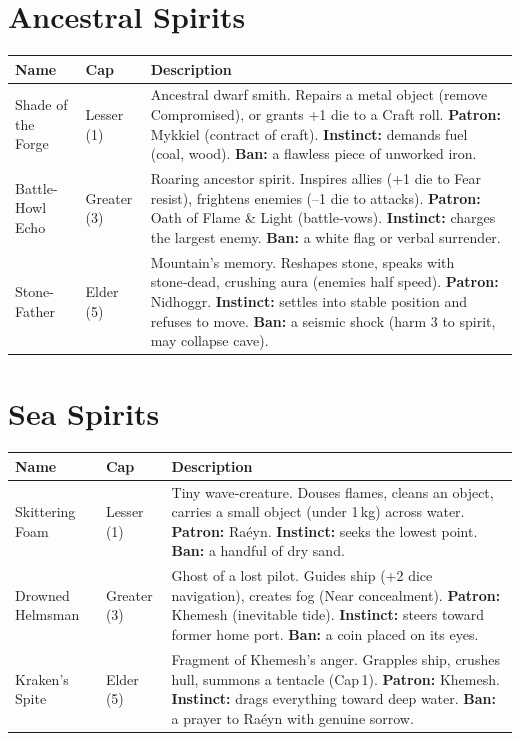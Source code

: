 \documentclass[10pt,a5paper]{book}
\begin{document}
\section{Ancestral Spirits}

\begin{longtable}{p{3cm} p{2.5cm} p{8cm}}
\toprule
Name & Cap & Description \\
\midrule
Shade of the Forge & Lesser (1) & Ancestral dwarf smith. Repairs a metal object (remove Compromised), or grants +1 die to a Craft roll. \textbf{Patron:} Mykkiel (contract of craft). \textbf{Instinct:} demands fuel (coal, wood). \textbf{Ban:} a flawless piece of unworked iron. \\
Battle-Howl Echo & Greater (3) & Roaring ancestor spirit. Inspires allies (+1 die to Fear resist), frightens enemies (–1 die to attacks). \textbf{Patron:} Oath of Flame \& Light (battle‑vows). \textbf{Instinct:} charges the largest enemy. \textbf{Ban:} a white flag or verbal surrender. \\
Stone-Father & Elder (5) & Mountain’s memory. Reshapes stone, speaks with stone‑dead, crushing aura (enemies half speed). \textbf{Patron:} Nidhoggr. \textbf{Instinct:} settles into stable position and refuses to move. \textbf{Ban:} a seismic shock (harm 3 to spirit, may collapse cave). \\
\bottomrule
\end{longtable}

\section{Sea Spirits}

\begin{longtable}{p{3cm} p{2.5cm} p{8cm}}
\toprule
Name & Cap & Description \\
\midrule
Skittering Foam & Lesser (1) & Tiny wave‑creature. Douses flames, cleans an object, carries a small object (under 1 kg) across water. \textbf{Patron:} Raéyn. \textbf{Instinct:} seeks the lowest point. \textbf{Ban:} a handful of dry sand. \\
Drowned Helmsman & Greater (3) & Ghost of a lost pilot. Guides ship (+2 dice navigation), creates fog (Near concealment). \textbf{Patron:} Khemesh (inevitable tide). \textbf{Instinct:} steers toward former home port. \textbf{Ban:} a coin placed on its eyes. \\
Kraken’s Spite & Elder (5) & Fragment of Khemesh’s anger. Grapples ship, crushes hull, summons a tentacle (Cap 1). \textbf{Patron:} Khemesh. \textbf{Instinct:} drags everything toward deep water. \textbf{Ban:} a prayer to Raéyn with genuine sorrow. \\
\bottomrule
\end{longtable}
\end{document}

